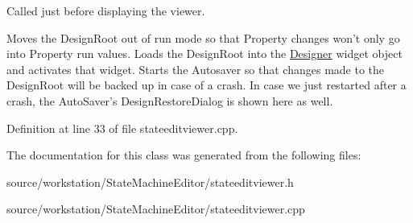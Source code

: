 Called just before displaying the viewer. 

Moves the Design\-Root out of run mode so that Property changes won't only go into Property run values. Loads the Design\-Root into the \hyperlink{class_designer}{Designer} widget object and activates that widget. Starts the Autosaver so that changes made to the Design\-Root will be backed up in case of a crash. In case we just restarted after a crash, the Auto\-Saver's Design\-Restore\-Dialog is shown here as well. 

Definition at line 33 of file stateeditviewer.\-cpp.



The documentation for this class was generated from the following files\-:\begin{DoxyCompactItemize}
\item 
source/workstation/\-State\-Machine\-Editor/stateeditviewer.\-h\item 
source/workstation/\-State\-Machine\-Editor/stateeditviewer.\-cpp\end{DoxyCompactItemize}
